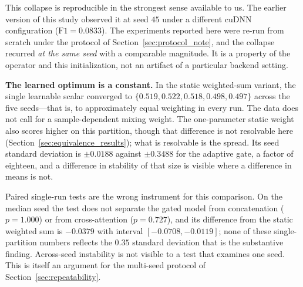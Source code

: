 \documentclass[journal]{IEEEtran}
\begin{document}
This collapse is reproducible in the strongest sense available to us. The earlier version of this study observed it at seed $45$ under a different cuDNN configuration ($\mathrm{F1}=0.0833$). The experiments reported here were re-run from scratch under the protocol of Section~\ref{sec:protocol_note}, and the collapse recurred \emph{at the same seed} with a comparable magnitude. It is a property of the operator and this initialization, not an artifact of a particular backend setting.

\textbf{The learned optimum is a constant.} In the static weighted-sum variant, the single learnable scalar converged to $\{0.519, 0.522, 0.518, 0.498, 0.497\}$ across the five seeds---that is, to approximately equal weighting in every run. The data does not call for a sample-dependent mixing weight. The one-parameter static weight also scores higher on this partition, though that difference is not resolvable here (Section~\ref{sec:equivalence_results}); what is resolvable is the spread. Its seed standard deviation is $\pm 0.0188$ against $\pm 0.3488$ for the adaptive gate, a factor of eighteen, and a difference in stability of that size is visible where a difference in means is not.

Paired single-run tests are the wrong instrument for this comparison. On the median seed the test does not separate the gated model from concatenation ($p = 1.000$) or from cross-attention ($p = 0.727$), and its difference from the static weighted sum is $-0.0379$ with interval $[-0.0708, -0.0119]$; none of these single-partition numbers reflects the $0.35$ standard deviation that is the substantive finding. Across-seed instability is not visible to a test that examines one seed. This is itself an argument for the multi-seed protocol of Section~\ref{sec:repeatability}.
\end{document}
